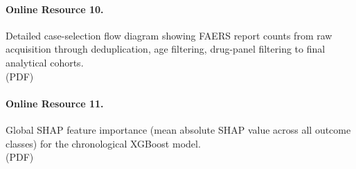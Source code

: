 \documentclass[10pt,a4paper]{article}
\begin{document}
\paragraph*{Online Resource 10.}\label{s1fig} Detailed case-selection flow diagram showing FAERS report counts from raw acquisition through deduplication, age filtering, drug-panel filtering to final analytical cohorts.\\
(PDF)

\paragraph*{Online Resource 11.}\label{s2fig} Global SHAP feature importance (mean absolute SHAP value across all outcome classes) for the chronological XGBoost model.\\
(PDF)
\end{document}
